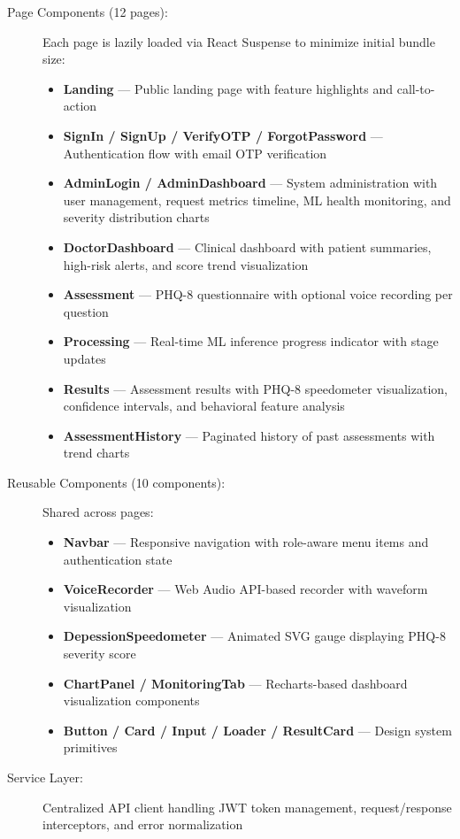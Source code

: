 \documentclass[12pt]{article}
\begin{document}
	\begin{description}
		\item[Page Components (12 pages):] Each page is lazily loaded via React Suspense to minimize initial bundle size:
		\begin{itemize}
			\item \textbf{Landing} --- Public landing page with feature highlights and call-to-action
			\item \textbf{SignIn / SignUp / VerifyOTP / ForgotPassword} --- Authentication flow with email OTP verification
			\item \textbf{AdminLogin / AdminDashboard} --- System administration with user management, request metrics timeline, ML health monitoring, and severity distribution charts
			\item \textbf{DoctorDashboard} --- Clinical dashboard with patient summaries, high-risk alerts, and score trend visualization
			\item \textbf{Assessment} --- PHQ-8 questionnaire with optional voice recording per question
			\item \textbf{Processing} --- Real-time ML inference progress indicator with stage updates
			\item \textbf{Results} --- Assessment results with PHQ-8 speedometer visualization, confidence intervals, and behavioral feature analysis
			\item \textbf{AssessmentHistory} --- Paginated history of past assessments with trend charts
		\end{itemize}

		\item[Reusable Components (10 components):] Shared across pages:
		\begin{itemize}
			\item \textbf{Navbar} --- Responsive navigation with role-aware menu items and authentication state
			\item \textbf{VoiceRecorder} --- Web Audio API-based recorder with waveform visualization
			\item \textbf{DepessionSpeedometer} --- Animated SVG gauge displaying PHQ-8 severity score
			\item \textbf{ChartPanel / MonitoringTab} --- Recharts-based dashboard visualization components
			\item \textbf{Button / Card / Input / Loader / ResultCard} --- Design system primitives
		\end{itemize}

		\item[Service Layer:] Centralized API client handling JWT token management, request/response interceptors, and error normalization
	\end{description}
\end{document}
